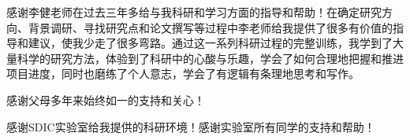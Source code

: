 \begin{thanks}

  感谢李健老师在过去三年多给与我科研和学习方面的指导和帮助！在确定研究方向、背景调研、寻找研究点和论文撰写等过程中李老师给我提供了很多有价值的指导和建议，使我少走了很多弯路。通过这一系列科研过程的完整训练，我学到了大量科学的研究方法，体验到了科研中的心酸与乐趣，学会了如何合理地把握和推进项目进度，同时也磨练了个人意志，学会了有逻辑有条理地思考和写作。
  
  感谢父母多年来始终如一的支持和关心！
  
  感谢SDIC实验室给我提供的科研环境！感谢实验室所有同学的支持和帮助！
 

\end{thanks}
